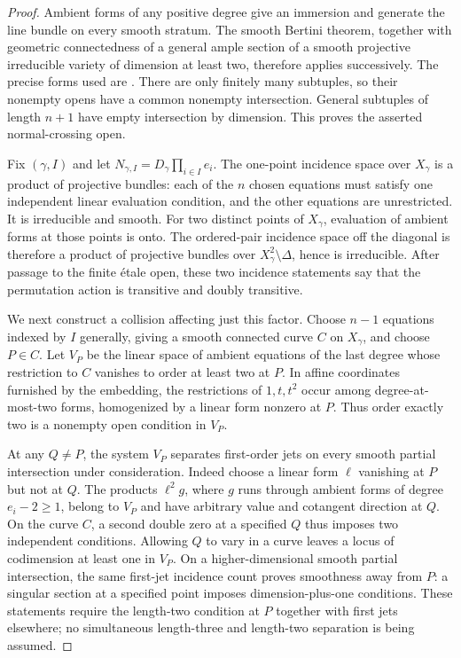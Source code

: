 \documentclass[11pt]{article}
\theoremstyle{remark}\newtheorem{remark}[theorem]{Remark}
\begin{document}
\begin{proof}
Ambient forms of any positive degree give an immersion and generate the line bundle on every smooth stratum. The smooth Bertini theorem, together with geometric connectedness of a general ample section of a smooth projective irreducible variety of dimension at least two, therefore applies successively. The precise forms used are \citet[Lemma~33.47.3 and Remark~37.32.4]{StacksBertini}. There are only finitely many subtuples, so their nonempty opens have a common nonempty intersection. General subtuples of length $n+1$ have empty intersection by dimension. This proves the asserted normal-crossing open.

Fix $(\gamma,I)$ and let $N_{\gamma,I}=D_\gamma\prod_{i\in I}e_i$. The one-point incidence space over $X_\gamma$ is a product of projective bundles: each of the $n$ chosen equations must satisfy one independent linear evaluation condition, and the other equations are unrestricted. It is irreducible and smooth. For two distinct points of $X_\gamma$, evaluation of ambient forms at those points is onto. The ordered-pair incidence space off the diagonal is therefore a product of projective bundles over $X_\gamma^2\setminus\Delta$, hence is irreducible. After passage to the finite \'etale open, these two incidence statements say that the permutation action is transitive and doubly transitive.

We next construct a collision affecting just this factor. Choose $n-1$ equations indexed by $I$ generally, giving a smooth connected curve $C$ on $X_\gamma$, and choose $P\in C$. Let $V_P$ be the linear space of ambient equations of the last degree whose restriction to $C$ vanishes to order at least two at $P$. In affine coordinates furnished by the embedding, the restrictions of $1,t,t^2$ occur among degree-at-most-two forms, homogenized by a linear form nonzero at $P$. Thus order exactly two is a nonempty open condition in $V_P$.

At any $Q\ne P$, the system $V_P$ separates first-order jets on every smooth partial intersection under consideration. Indeed choose a linear form $\ell$ vanishing at $P$ but not at $Q$. The products $\ell^2g$, where $g$ runs through ambient forms of degree $e_i-2\ge1$, belong to $V_P$ and have arbitrary value and cotangent direction at $Q$. On the curve $C$, a second double zero at a specified $Q$ thus imposes two independent conditions. Allowing $Q$ to vary in a curve leaves a locus of codimension at least one in $V_P$. On a higher-dimensional smooth partial intersection, the same first-jet incidence count proves smoothness away from $P$: a singular section at a specified point imposes dimension-plus-one conditions. These statements require the length-two condition at $P$ together with first jets elsewhere; no simultaneous length-three and length-two separation is being assumed.


\end{proof}
\end{document}
